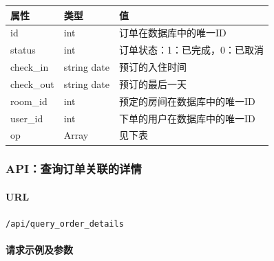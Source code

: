 \documentclass[]{article}
\let\oldparagraph\paragraph
\renewcommand{\paragraph}[1]{\oldparagraph{#1}\mbox{}}
\begin{document}
\begin{Shaded}
\begin{Highlighting}[]
\FunctionTok{\{}
    \FunctionTok{:} \OtherTok{[}
        \FunctionTok{\{}
            \FunctionTok{:} \FunctionTok{,}
            \FunctionTok{:}  \FunctionTok{,}
            \FunctionTok{:} \FunctionTok{,}
            \FunctionTok{:} \FunctionTok{,}
            \FunctionTok{:} \FunctionTok{,}
            \FunctionTok{:} \FunctionTok{,}
        \FunctionTok{\}}\OtherTok{,}
        \FunctionTok{\{}
        \FunctionTok{\}}
    \OtherTok{]}
\FunctionTok{\}}
\end{Highlighting}
\end{Shaded}

\begin{longtable}[]{@{}lll@{}}
\toprule
属性 & 类型 & 值\tabularnewline
\midrule
\endhead
id & int & 订单在数据库中的唯一ID\tabularnewline
status & int & 订单状态：1：已完成，0：已取消\tabularnewline
check\_in & string date & 预订的入住时间\tabularnewline
check\_out & string date & 预订的最后一天\tabularnewline
room\_id & int & 预定的房间在数据库中的唯一ID\tabularnewline
user\_id & int & 下单的用户在数据库中的唯一ID\tabularnewline
op & Array & 见下表\tabularnewline
\bottomrule
\end{longtable}

\hypertarget{apiux67e5ux8be2ux8ba2ux5355ux5173ux8054ux7684ux8be6ux60c5}{%
\subsubsection{API：查询订单关联的详情}\label{apiux67e5ux8be2ux8ba2ux5355ux5173ux8054ux7684ux8be6ux60c5}}

\hypertarget{url-5}{%
\paragraph{URL}\label{url-5}}

\texttt{/api/query\_order\_details}

\hypertarget{ux8bf7ux6c42ux793aux4f8bux53caux53c2ux6570-4}{%
\paragraph{请求示例及参数}\label{ux8bf7ux6c42ux793aux4f8bux53caux53c2ux6570-4}}
\end{document}
